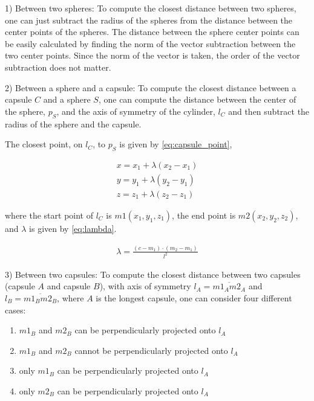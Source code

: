 \documentclass[a4paper, 10pt, conference]{ieeeconf}      %
\begin{document}
1) Between two spheres: 
To compute the closest distance between two spheres, one can just subtract the radius of the spheres from the distance between the center points of the spheres. The distance between the sphere center points can be easily calculated by finding the norm of the vector subtraction between the two center points. Since the norm of the vector is taken, the order of the vector subtraction does not matter.

2) Between a sphere and a capsule:
To compute the closest distance between a capsule $C$ and a sphere $S$, one can compute the distance between the center of the sphere, $p_S$, and the axis of symmetry of the cylinder, $l_C$
and then subtract the radius of the sphere and the capsule. 

The closest point, on $l_C$, to $p_S$ is given by \eqref{eq:capsule_point},

\begin{equation}       
    \begin{matrix} 
        x = x_1 + \lambda(x_2 - x_1) \\
        y = y_1 + \lambda(y_2 - y_1) \\
        z = z_1 + \lambda(z_2 - z_1) \label{eq:capsule_point}
    \end{matrix}
\end{equation}

where the start point of $l_C$ is $m1(x_1, y_1, z_1)$, the end point is $m2(x_2, y_2, z_2)$, and $\lambda$ is given by \eqref{eq:lambda}.

\begin{equation}       
    \begin{matrix} 
        \lambda = \frac{(c - m_1) \cdot (m_2 - m_1 )}{l^2} \label{eq:lambda}
    \end{matrix}
\end{equation}

3) Between two capsules:
To compute the closest distance between two capsules (capsule $A$ and capsule $B$), with axis of symmetry $l_A = \overline{m1_A m2_A}$ and $l_B = \overline{m1_B m2_B}$, 
where $A$ is the longest capsule, one can consider four different cases:
\begin{enumerate}
    \item $m1_B$ and $m2_B$ can be perpendicularly projected onto $l_A$
    \item $m1_B$ and $m2_B$ cannot be perpendicularly projected onto $l_A$
    \item only $m1_B$ can be perpendicularly projected onto $l_A$
    \item only $m2_B$ can be perpendicularly projected onto $l_A$
\end{enumerate} 
\end{document}
